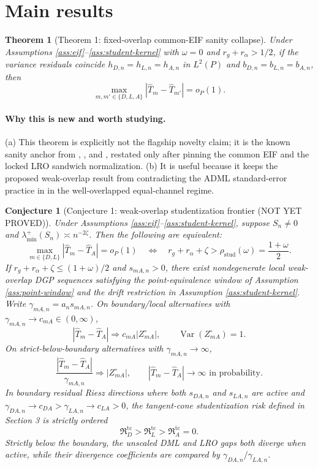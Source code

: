\documentclass[11pt]{article}
\theoremstyle{definition}
\theoremstyle{plain}
\newtheorem{theorem}{Theorem}
\newtheorem{conjecture}{Conjecture}
\theoremstyle{remark}
\begin{document}
\section{Main results}
\begin{theorem}[Theorem 1: fixed-overlap common-EIF sanity collapse]\label{thm:common-eif}
Under Assumptions \ref{ass:eif}--\ref{ass:student-kernel} with \(\omega=0\)
and \(r_g+r_\alpha>1/2\), if the variance residuals coincide
\(h_{D,n}=h_{L,n}=h_{A,n}\) in \(L^2(P)\) and
\(b_{D,n}=b_{L,n}=b_{A,n}\), then
\[
  \max_{m,m'\in\{D,L,A\}}
  \left|\widehat T_m-\widehat T_{m'}\right|=o_P(1).
\]
\end{theorem}
\paragraph{Why this is new and worth studying.}
(a) This theorem is explicitly not the flagship novelty claim; it is the
known sanity anchor from \citet{ChernozhukovEtAl2018DML},
\citet{ChernozhukovEscancianoIchimuraNeweyRobins2022LRO}, and
\citet{ChernozhukovNeweySingh2022ADML}, restated only after pinning the common
EIF and the locked LRO sandwich normalization.  (b) It is useful because it
keeps the proposed weak-overlap result from contradicting the ADML
standard-error practice in \citet{ChernozhukovNeweySingh2022ADML} in the
well-overlapped equal-channel regime.

\begin{conjecture}[Conjecture 1: weak-overlap studentization frontier (NOT YET PROVED)]\label{conj:student-frontier}
Under Assumptions \ref{ass:eif}--\ref{ass:student-kernel}, suppose
\(S_n\ne0\) and \(\lambda_{\min}^+(S_n)\asymp n^{-2\zeta}\).  Then the
following are equivalent:
\[
  \max_{m\in\{D,L\}}|\widehat T_m-\widehat T_A|=o_P(1)
  \quad\Longleftrightarrow\quad
  r_g+r_\alpha+\zeta>\rho_{\mathrm{stud}}(\omega)=\frac{1+\omega}{2}.
\]
If \(r_g+r_\alpha+\zeta\le (1+\omega)/2\) and \(s_{mA,n}>0\), there exist
nondegenerate local weak-overlap DGP sequences satisfying the point-equivalence
window of Assumption \ref{ass:point-window} and the drift restriction in
Assumption \ref{ass:student-kernel}.  Write
\(\gamma_{mA,n}=a_n s_{mA,n}\).  On boundary/local alternatives with
\(\gamma_{mA,n}\to c_{mA}\in(0,\infty)\),
\[
  |\widehat T_m-\widehat T_A|
  \Rightarrow
  c_{mA}|Z_{mA}^\circ|,\qquad
  \operatorname{Var}(Z_{mA}^\circ)=1.
\]
On strict-below-boundary alternatives with
\(\gamma_{mA,n}\to\infty\),
\[
  \frac{|\widehat T_m-\widehat T_A|}{\gamma_{mA,n}}
  \Rightarrow |Z_{mA}^\circ|,
  \qquad
  |\widehat T_m-\widehat T_A|\to\infty \text{ in probability}.
\]
In boundary residual Riesz directions where both \(s_{DA,n}\) and
\(s_{LA,n}\) are active and
\(\gamma_{DA,n}\to c_{DA}>\gamma_{LA,n}\to c_{LA}>0\), the tangent-cone
studentization risk defined in Section 3 is strictly ordered
\[
  \mathfrak R_D^{\mathrm{tc}}>
  \mathfrak R_L^{\mathrm{tc}}>
  \mathfrak R_A^{\mathrm{tc}}=0.
\]
Strictly below the boundary, the unscaled DML and LRO gaps both diverge when
active, while their divergence coefficients are compared by
\(\gamma_{DA,n}/\gamma_{LA,n}\).
\end{conjecture}
\end{document}
